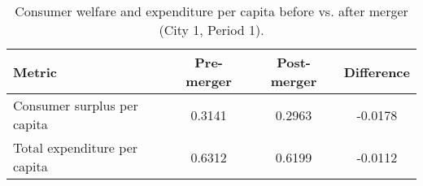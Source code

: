 \begin{table}[H]
\centering
\caption{Consumer welfare and expenditure per capita before vs. after merger (City 1, Period 1).}
\begin{tabular}{lccc}
\toprule
Metric & Pre-merger & Post-merger & Difference \\
\midrule
Consumer surplus per capita & 0.3141 & 0.2963 & -0.0178 \\
Total expenditure per capita & 0.6312 & 0.6199 & -0.0112 \\
\bottomrule
\end{tabular}
\label{tab:q17_sum_c1t1}
\end{table}
